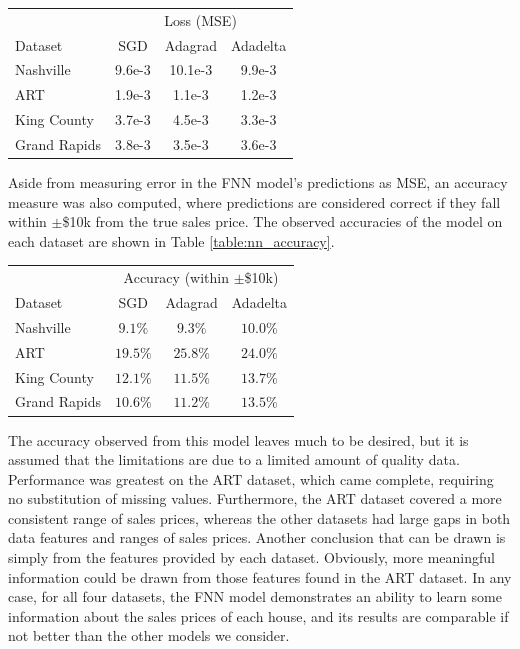 \documentclass[10pt]{article}
\begin{document}
\begin{multicols}{2}
		\begin{center}
			\captionsetup{type=table}
			\begin{tabular}{l|c|c|c}
				& \multicolumn{3}{c}{Loss (MSE)} \\
				Dataset & SGD & Adagrad & Adadelta \\
				\hline
				Nashville & 9.6e-3 & 10.1e-3 & 9.9e-3 \\
				ART & 1.9e-3 & 1.1e-3 & 1.2e-3 \\
				King County & 3.7e-3 & 4.5e-3 & 3.3e-3 \\
				Grand Rapids & 3.8e-3 & 3.5e-3 & 3.6e-3 \\
			\end{tabular}
			\label{table:nn_performance}
		\end{center}
	
		Aside from measuring error in the FNN model's predictions as MSE, an accuracy measure was also computed, where predictions are considered correct if they fall within \(\pm\)\$10k from the true sales price. The observed accuracies of the model on each dataset are shown in Table \ref{table:nn_accuracy}.
		
		\begin{center}
		\captionsetup{type=table}
		\begin{tabular}{l|c|c|c}
			& \multicolumn{3}{c}{Accuracy (within \(\pm\)\$10k)} \\
			Dataset & SGD & Adagrad & Adadelta \\
			\hline
			Nashville & \(9.1\%\) & \(9.3\%\) & \(10.0\%\) \\
			ART & \(19.5\%\) & \(25.8\%\) & \(24.0\%\) \\
			King County & \(12.1\%\) & \(11.5\%\) & \(13.7\%\) \\
			Grand Rapids & \(10.6\%\) & \(11.2\%\) & \(13.5\%\) \\
		\end{tabular}
		\label{table:nn_accuracy}
		\end{center}
		
		The accuracy observed from this model leaves much to be desired, but it is assumed that the limitations are due to a limited amount of quality data. Performance was greatest on the ART dataset, which came complete, requiring no substitution of missing values. Furthermore, the ART dataset covered a more consistent range of sales prices, whereas the other datasets had large gaps in both data features and ranges of sales prices. Another conclusion that can be drawn is simply from the features provided by each dataset. Obviously, more meaningful information could be drawn from those features found in the ART dataset. In any case, for all four datasets, the FNN model demonstrates an ability to learn some information about the sales prices of each house, and its results are comparable if not better than the other models we consider.
		

\end{multicols}
\end{document}
